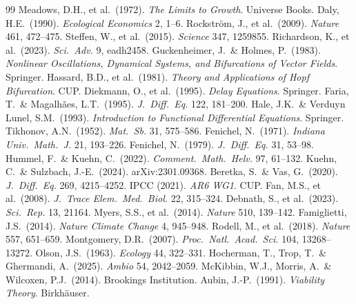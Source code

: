 \documentclass[11pt]{article}
\theoremstyle{definition}
\begin{document}
\begin{thebibliography}{99}
 Meadows, D.H., et al.\ (1972). \textit{The Limits to Growth}. Universe Books.
 Daly, H.E.\ (1990). \textit{Ecological Economics} 2, 1--6.
 Rockstr\"om, J., et al.\ (2009). \textit{Nature} 461, 472--475.
 Steffen, W., et al.\ (2015). \textit{Science} 347, 1259855.
 Richardson, K., et al.\ (2023). \textit{Sci.\ Adv.} 9, eadh2458.
 Guckenheimer, J.\ \& Holmes, P.\ (1983). \textit{Nonlinear Oscillations, Dynamical Systems, and Bifurcations of Vector Fields}. Springer.
 Hassard, B.D., et al.\ (1981). \textit{Theory and Applications of Hopf Bifurcation}. CUP.
 Diekmann, O., et al.\ (1995). \textit{Delay Equations}. Springer.
 Faria, T.\ \& Magalh\~aes, L.T.\ (1995). \textit{J.\ Diff.\ Eq.} 122, 181--200.
 Hale, J.K.\ \& Verduyn Lunel, S.M.\ (1993). \textit{Introduction to Functional Differential Equations}. Springer.
 Tikhonov, A.N.\ (1952). \textit{Mat.\ Sb.} 31, 575--586.
 Fenichel, N.\ (1971). \textit{Indiana Univ.\ Math.\ J.} 21, 193--226.
 Fenichel, N.\ (1979). \textit{J.\ Diff.\ Eq.} 31, 53--98.
 Hummel, F.\ \& Kuehn, C.\ (2022). \textit{Comment.\ Math.\ Helv.} 97, 61--132.
 Kuehn, C.\ \& Sulzbach, J.-E.\ (2024). arXiv:2301.09368.
 Beretka, S.\ \& Vas, G.\ (2020). \textit{J.\ Diff.\ Eq.} 269, 4215--4252.
 IPCC (2021). \textit{AR6 WG1}. CUP.
 Fan, M.S., et al.\ (2008). \textit{J.\ Trace Elem.\ Med.\ Biol.} 22, 315--324.
 Debnath, S., et al.\ (2023). \textit{Sci.\ Rep.} 13, 21164.
 Myers, S.S., et al.\ (2014). \textit{Nature} 510, 139--142.
 Famiglietti, J.S.\ (2014). \textit{Nature Climate Change} 4, 945--948.
 Rodell, M., et al.\ (2018). \textit{Nature} 557, 651--659.
 Montgomery, D.R.\ (2007). \textit{Proc.\ Natl.\ Acad.\ Sci.} 104, 13268--13272.
 Olson, J.S.\ (1963). \textit{Ecology} 44, 322--331.
 Hocherman, T., Trop, T.\ \& Ghermandi, A.\ (2025). \textit{Ambio} 54, 2042--2059.
 McKibbin, W.J., Morris, A.\ \& Wilcoxen, P.J.\ (2014). Brookings Institution.
 Aubin, J.-P.\ (1991). \textit{Viability Theory}. Birkh\"auser.

\end{thebibliography}
\end{document}
